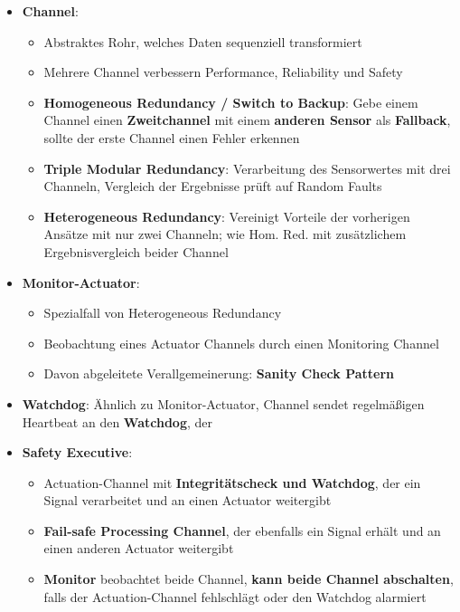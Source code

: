 \begin{itemize}
	\item \textbf{Channel}:
	\begin{itemize}
		\item Abstraktes Rohr, welches Daten sequenziell transformiert
		\item Mehrere Channel verbessern Performance, Reliability und Safety
		\item \textbf{Homogeneous Redundancy / Switch to Backup}: Gebe einem Channel einen \textbf{Zweitchannel} mit einem \textbf{anderen Sensor} als \textbf{Fallback}, sollte der erste Channel einen Fehler erkennen
		\item \textbf{Triple Modular Redundancy}: Verarbeitung des Sensorwertes mit drei Channeln, Vergleich der Ergebnisse prüft auf Random Faults
		\item \textbf{Heterogeneous Redundancy}: Vereinigt Vorteile der vorherigen Ansätze mit nur zwei Channeln; wie Hom. Red. mit zusätzlichem Ergebnisvergleich beider Channel
	\end{itemize}
	\item \textbf{Monitor-Actuator}:
	\begin{itemize}
		\item Spezialfall von Heterogeneous Redundancy
		\item Beobachtung eines Actuator Channels durch einen Monitoring Channel
		\item Davon abgeleitete Verallgemeinerung: \textbf{Sanity Check Pattern}
	\end{itemize}
	\item \textbf{Watchdog}: Ähnlich zu Monitor-Actuator, Channel sendet regelmäßigen Heartbeat an den \textbf{Watchdog}, der 
	\item \textbf{Safety Executive}:
	\begin{itemize}
		\item Actuation-Channel mit \textbf{Integritätscheck und Watchdog}, der ein Signal verarbeitet und an einen Actuator weitergibt
		\item \textbf{Fail-safe Processing Channel}, der ebenfalls ein Signal erhält und an einen anderen Actuator weitergibt
		\item \textbf{Monitor} beobachtet beide Channel, \textbf{kann beide Channel abschalten}, falls der Actuation-Channel fehlschlägt oder den Watchdog alarmiert
	\end{itemize}
\end{itemize}